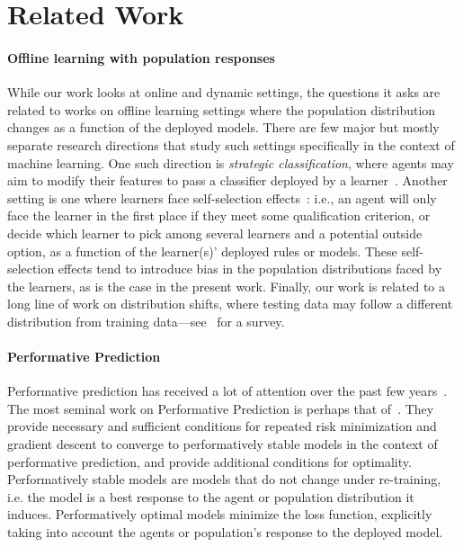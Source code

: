 \section{Related Work}

\paragraph{Offline learning with population responses} While our work looks at online and dynamic settings, the questions it asks are related to works on offline learning settings where the population distribution changes as a function of the deployed models. There are few major but mostly separate research directions that study such settings specifically in the context of machine learning. One such direction is \emph{strategic classification}, where agents may aim to modify their features to pass a classifier deployed by a learner~\cite{bruckner2011stackelberg, hardt2016strategic, jagadeesan2021alternative,stratindark,bechavod2022information,haghtalab2023calibrated,cohen2023sequential}. Another setting is one where learners face self-selection effects~\cite{cherapanamjeri2023makes,horowitz2024classification,gaitonde2024sample,zampetakis2022analyzing}: i.e., an agent will only face the learner in the first place if they meet some qualification criterion, or decide which learner to pick among several learners and a potential outside option, as a function of the learner(s)' deployed rules or models. These self-selection effects tend to introduce bias in the population distributions faced by the learners, as is the case in the present work. Finally, our work is related to a long line of work on distribution shifts, where testing data may follow a different distribution from training data---see~\cite{koh2021wilds} for a survey.

\paragraph{Performative Prediction} Performative prediction has received a lot of attention over the past few years~\cite{pmlr-v119-perdomo20a, NEURIPS2020_33e75ff0, pmlr-v151-brown22a,bechavod2021gaming,shavit2020causal,mendler2020stochastic,hardt2022performative,hardt2023performative}. The most seminal work on Performative Prediction is perhaps that of~\citet{pmlr-v119-perdomo20a}. They provide necessary and sufficient conditions for repeated risk minimization and gradient descent to converge to performatively stable models in the context of performative prediction, and provide additional conditions for optimality. Performatively stable models are models that do not change under re-training, i.e. the model is a best response to the agent or population distribution it induces. Performatively optimal models minimize the loss function, explicitly taking into account the agents or population's response to the deployed model.

